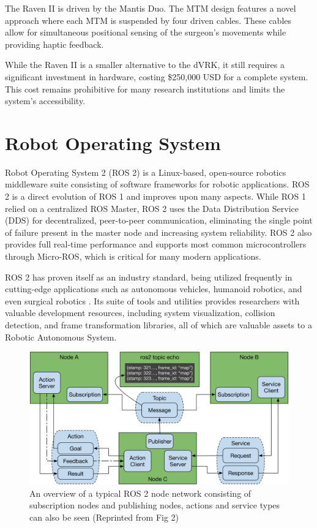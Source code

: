 The Raven II is driven by the Mantis Duo. The MTM design features a novel approach where each MTM is suspended by four driven cables. These cables allow for simultaneous positional sensing of the surgeon's movements while providing haptic feedback.

While the Raven II is a smaller alternative to the dVRK, it still requires a significant investment in hardware, costing \$250,000 USD \cite{RobotsGuideRaven} for a complete system. This cost remains prohibitive for many research institutions and limits the system's accessibility.
\section{Robot Operating System}

Robot Operating System 2 (ROS 2) is a Linux-based, open-source robotics middleware suite consisting of software frameworks for robotic applications. ROS 2 is a direct evolution of ROS 1 and improves upon many aspects. While ROS 1 relied on a centralized ROS Master, ROS 2 uses the Data Distribution Service (DDS) for decentralized, peer-to-peer communication, eliminating the single point of failure present in the master node and increasing system reliability. ROS 2 also provides full real-time performance and supports most common microcontrollers through Micro-ROS, which is critical for many modern applications.

ROS 2 has proven itself as an industry standard, being utilized frequently in cutting-edge applications such as autonomous vehicles, humanoid robotics, and even surgical robotics \cite{Chen2013OpenSource}. Its suite of tools and utilities provides researchers with valuable development resources, including system visualization, collision detection, and frame transformation libraries, all of which are valuable assets to a Robotic Autonomous System.


\begin{figure}[H]
    \centering
    \includegraphics[width=1\linewidth]{figures/ROS2.png}
    \caption{An overview of a typical ROS 2 node network consisting of subscription nodes and publishing nodes, actions and service types can also be seen (Reprinted from \cite{doi:10.1126/scirobotics.abm6074} Fig 2)}
    \label{fig:ROS2}
\end{figure}


